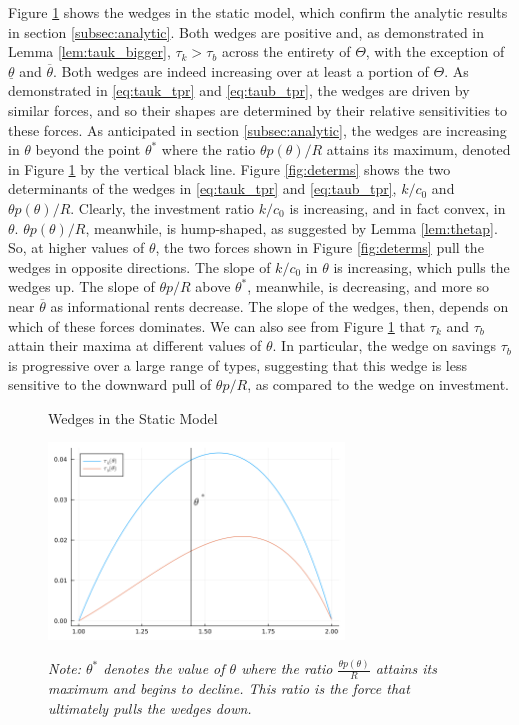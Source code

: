 \documentclass[11pt]{article}
\begin{document}
Figure \ref{fig:static_wedges} shows the wedges in the static model, which confirm the analytic results in section \ref{subsec:analytic}. Both wedges are positive and, as demonstrated in Lemma \ref{lem:tauk_bigger}, \( \tau_k>\tau_b \) across the entirety of \( \Theta \), with the exception of \( \underline{\theta} \) and \( \overline{\theta} \). Both wedges are indeed increasing over at least a portion of \( \Theta \). As demonstrated in \eqref{eq:tauk_tpr} and \eqref{eq:taub_tpr}, the wedges are driven by similar forces, and so their shapes are determined by their relative sensitivities to these forces. As anticipated in section \ref{subsec:analytic}, the wedges are increasing in \( \theta \) beyond the point \( \theta^* \) where the ratio \( \theta p\left( \theta \right)/R \) attains its maximum, denoted in Figure \ref{fig:static_wedges} by the vertical black line. Figure \ref{fig:determs} shows the two determinants of the wedges in \eqref{eq:tauk_tpr} and \eqref{eq:taub_tpr}, \( k/c_0 \) and \( \theta p(\theta) / R \). Clearly, the investment ratio \( k/c_0 \) is increasing, and in fact convex, in \( \theta \). \( \theta p(\theta) / R \), meanwhile, is hump-shaped, as suggested by Lemma \ref{lem:thetap}. So, at higher values of \( \theta \), the two forces shown in Figure \ref{fig:determs} pull the wedges in opposite directions. The slope of \( k/c_0 \) in \( \theta \) is increasing, which pulls the wedges up. The slope of \( \theta p/R \) above \( \theta^* \), meanwhile, is decreasing, and more so near \( \overline{\theta} \) as informational rents decrease. The slope of the wedges, then, depends on which of these forces dominates. We can also see from Figure \ref{fig:static_wedges} that \( \tau_k \) and \( \tau_b \) attain their maxima at different values of \( \theta \). In particular, the wedge on savings \( \tau_b \) is progressive over a large range of types, suggesting that this wedge is less sensitive to the downward pull of \( \theta p / R \), as compared to the wedge on investment.

\begin{figure}[htbp]
    \centering
    \caption{Wedges in the Static Model}
    \includegraphics[width = 0.7\textwidth]{figures/wedges.png}
    \label{fig:static_wedges}
    \caption*{\textit{Note: \( \theta^* \) denotes the value of \( \theta \) where the ratio \( \frac{\theta p\left( \theta \right)}{R} \) attains its maximum and begins to decline. This ratio is the force that ultimately pulls the wedges down.}}
\end{figure}
\end{document}
